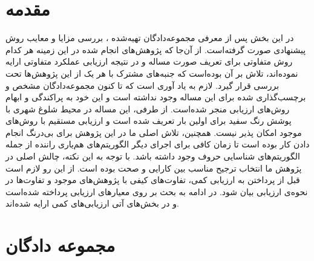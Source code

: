 
\label{chap:result}
\pagebreak

\section{مقدمه}

در این بخش پس از معرفی مجموعه‌دادگان تهیه‌شده \cite{khazaee2016aut}، بررسی مزایا و معایب روش پیشنهادی صورت گرفته‌است. از آن‌جا که پژوهش‌های انجام شده‌ در این زمینه هر کدام روش متفاوتی برای تعریف صورت مساله و در نتیجه ارزیابی عملکرد متفاوتی ارایه نموده‌اند، تلاش بر آن بوده‌است که جنبه‌های مشترک با هر یک از این پژوهش‌ها تحت بررسی قرار گیرد. لازم به یاد آوری است که تا کنون مجموعه‌دادگان مشخص و برچسب‌گذاری شده برای این مساله وجود نداشته است و این خود به پراکندگی و ابهام روش‌های ارزیابی منجر شده‌است. از طرفی، این مساله در محیط شلوغ شهری با پوشش رنگ سفید برای اولین بار تعریف شده است و ارزیابی مستقیم با روش‌های موجود امکان پذیر نیست. همچنین، تلاش اصلی ما در این پژوهش برای بی‌درنگ انجام دادن کار بوده است تا زمان کافی برای اجرای دیگر الگوریتم‌های هم‌یاری راننده از جمله الگوریتم‌های شناسایی حروف وجود داشته باشد. با توجه به این نکته، چالش اصلی در پژوهش ما انتخاب ترجیح مناسب بین کارایی و صحت بوده است. از این رو لازم است قبل از پرداختن به ارزیابی کمی، تفاوت‌های کیفی با پژوهش‌های موجود و تفاوت‌ها در نحوه‌ی ارزیابی بیان شود. در ادامه به بحث بر روی معیارهای ارزیابی پرداخته شده‌است و در بخش‌های آتی ارزیابی‌های کمی ارایه شده‌اند. 


\section{مجموعه دادگان}

